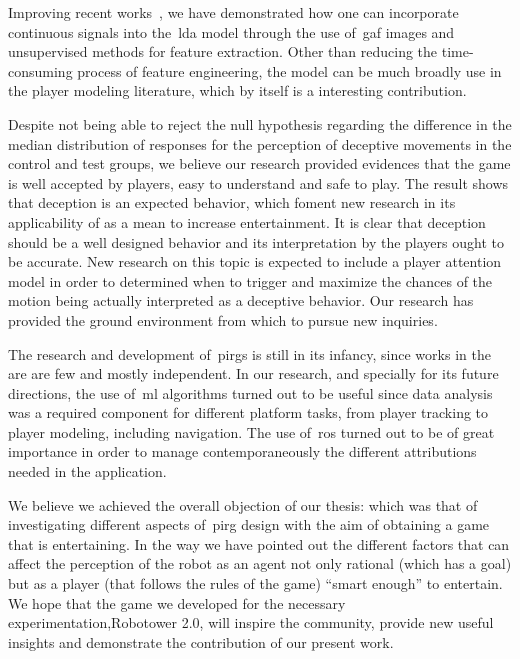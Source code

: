 Improving recent works~\citep{smith_mining_2016}, we have demonstrated how one can incorporate continuous signals into the~\gls{lda} model through the use of~\gls{gaf} images and unsupervised methods for feature extraction. Other than reducing the time-consuming process of feature engineering, the model can be much broadly use in the player modeling literature, which by itself is a interesting contribution. 

Despite not being able to reject the null hypothesis regarding the difference in the median distribution of responses for the perception of deceptive movements in the control and test groups, we believe our research provided evidences that the game is well accepted by players, easy to understand and safe to play. The result shows that deception is an expected behavior, which foment new research in its applicability of as a mean to increase entertainment. It is clear that deception should be a well designed behavior and its interpretation by the players ought to be accurate. New research on this topic is expected to include a player attention model in order to determined when to trigger and maximize the chances of the motion being actually interpreted as a deceptive behavior. Our research has provided the ground environment from which to pursue new inquiries.

The research and development of~\gls{pirg}s is still in its infancy, since works in the are are few and mostly independent. In our research, and specially for its future directions, the use of~\gls{ml} algorithms turned out to be useful since data analysis was a required component for different platform tasks, from player tracking to player modeling, including navigation. The use of~\gls{ros} turned out to be of great importance in order to manage contemporaneously the different attributions needed in the application.

We believe we achieved the overall objection of our thesis: which was that of investigating different aspects of~\gls{pirg} design with the aim of obtaining a game that is entertaining. In the way we have pointed out the different factors that can affect the perception of the robot as an agent not only rational (which has a goal) but as a player (that follows the rules of the game) ``smart enough'' to entertain. We hope that the game we developed for the necessary experimentation,\ie Robotower 2.0, will inspire the community, provide new useful insights and demonstrate the contribution of our present work. 

